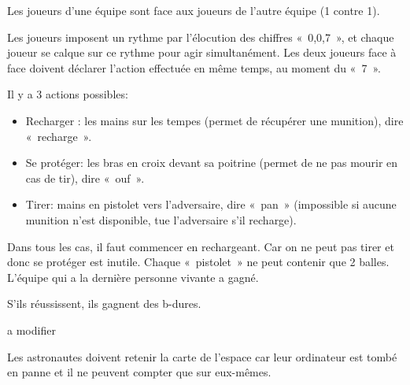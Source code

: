 \documentclass{grand-jeu}
\begin{document}
\begin{regles}
Les joueurs d'une équipe sont face aux joueurs de l'autre équipe (1 contre 1). 

Les joueurs imposent un rythme par l'élocution des chiffres « 0,0,7 », et chaque joueur se calque sur ce rythme pour agir simultanément. Les deux joueurs face à face doivent déclarer l'action effectuée en même temps, au moment du « 7 ». 

\vspace{0.2cm}
Il y a 3 actions possibles: 
\begin{itemize}
  \item Recharger : les mains sur les tempes (permet de récupérer une munition), dire « recharge ».
  \item Se protéger: les bras en croix devant sa poitrine (permet de ne pas mourir en cas de tir), dire « ouf ». 
  \item Tirer: mains en pistolet vers l'adversaire, dire « pan » (impossible si aucune munition n'est disponible, tue l'adversaire s'il recharge).
\end{itemize}

Dans tous les cas, il faut commencer en rechargeant. Car on ne peut pas tirer et donc se protéger est inutile. Chaque « pistolet » ne peut contenir que 2 balles. L’équipe qui a la dernière personne vivante a gagné.

S’ils réussissent, ils gagnent des b-dures.
\end{regles}

\begin{imaginaire}
a modifier

Les astronautes doivent retenir la carte de l’espace car leur ordinateur est tombé en panne et il ne peuvent compter que sur eux-mêmes.
\end{imaginaire}

\begin{moments-stop}
\end{moments-stop}
\end{document}
